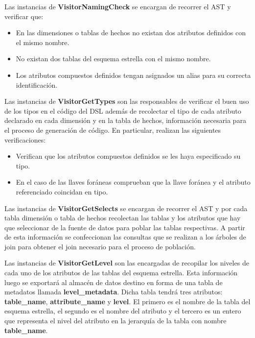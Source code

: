 Las instancias de \textbf{VisitorNamingCheck} se encargan de recorrer el AST y verificar que: 

\begin{itemize}
    \item En las dimensiones o tablas de hechos no existan dos atributos definidos con el mismo nombre.
    \item No existan dos tablas del esquema estrella con el mismo nombre.
    \item Los atributos compuestos definidos tengan asignados un alias para su correcta identificación.
\end{itemize}

Las instancias de \textbf{VisitorGetTypes} son las responsables de verificar el buen uso de los tipos en el 
código del DSL además de recolectar el tipo de cada atributo declarado en cada dimensión y 
en la tabla de hechos, 
información necesaria para el proceso de generación de código. En particular, realizan 
las siguientes verificaciones: 

\begin{itemize}
    \item Verifican que los atributos compuestos definidos se les haya especificado su tipo.
    \item En el caso de las llaves for\'aneas comprueban que la llave for\'anea y el atributo referenciado 
        coincidan en tipo.
\end{itemize}

Las instancias de \textbf{VisitorGetSelects} se encargan de recorrer el AST y por cada tabla dimensión o tabla 
de hechos recolectan las tablas y los atributos que hay que seleccionar de la fuente de datos 
para poblar las tablas respectivas. A partir de esta información se confeccionan las consultas 
que se realizan a los \'arboles de join para obtener el join necesario para el proceso de población.

Las instancias de \textbf{VisitorGetLevel} son las encargadas de recopilar los niveles de cada uno de los 
atributos de las tablas del esquema estrella. Esta información luego se exportar\'a al almacén de datos 
destino en forma de una tabla de metadatos llamada \textbf{level\_metadata}. Dicha tabla tendrá tres atributos: 
\textbf{table\_name}, \textbf{attribute\_name} y \textbf{level}. El primero es el nombre de la tabla del esquema 
estrella, el segundo es el nombre del atributo y el tercero es un entero que representa el nivel del atributo 
en la jerarquía de la tabla con nombre \textbf{table\_name}.

